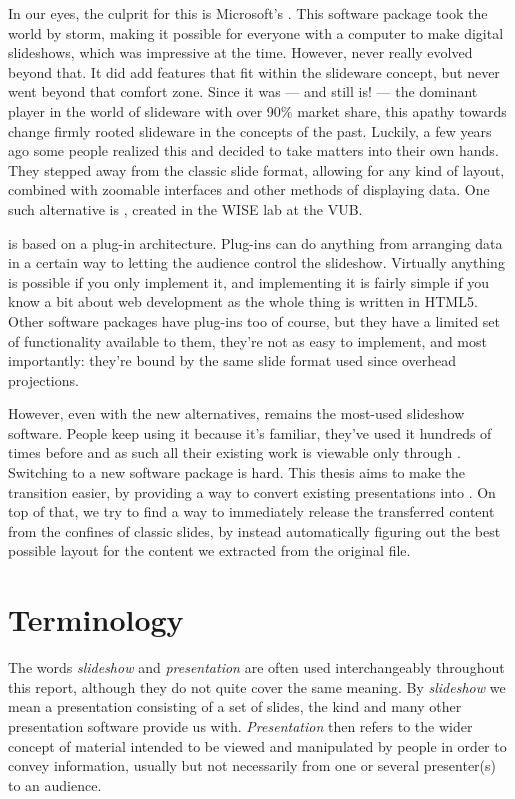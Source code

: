   In our eyes, the culprit for this is Microsoft's \ppt. This software package
  took the world by storm, making it possible for everyone with a computer to
  make digital slideshows, which was impressive at the time. However, \ppt*
  never really evolved beyond that. It did add features that fit within the
  slideware concept, but never went beyond that comfort zone. Since it was ---
  and still is! --- the dominant player in the world of slideware with over
  90\% market share, this apathy towards change firmly rooted slideware in the
  concepts of the past. Luckily, a few years ago some people realized this and
  decided to take matters into their own hands. They stepped away from the
  classic slide format, allowing for any kind of layout, combined with zoomable
  interfaces and other methods of displaying data. One such alternative is
  \mxp, created in the WISE lab at the VUB.

  \mxp is based on a plug-in architecture. Plug-ins can do anything from
  arranging data in a certain way to letting the audience control the
  slideshow. Virtually anything is possible if you only implement it, and
  implementing it is fairly simple if you know a bit about web development as
  the whole thing is written in HTML5. Other software packages have plug-ins
  too of course, but they have a limited set of functionality available to
  them, they're not as easy to implement, and most importantly: they're bound
  by the same slide format used since overhead projections.

  However, even with the new alternatives, \ppt* remains the most-used slideshow
  software. People keep using it because it's familiar, they've used it
  hundreds of times before and as such all their existing work is viewable only
  through \ppt. Switching to a new software package is hard. This thesis aims
  to make the transition easier, by providing a way to convert existing \ppt
  presentations into \mxp. On top of that, we try to find a way to immediately
  release the transferred content from the confines of classic slides, by
  instead automatically figuring out the best possible layout for the content
  we extracted from the original \ppt file.

  \section{Terminology}


   The words \emph{slideshow} and \emph{presentation} are often used
   interchangeably throughout this report, although they do not quite cover the
   same meaning. By \emph{slideshow} we mean a presentation consisting of a set
   of slides, the kind \ppt* and many other presentation software provide us
   with. \emph{Presentation} then refers to the wider concept of material
   intended to be viewed and manipulated by people in order to convey
   information, usually but not necessarily from one or several presenter(s) to
   an audience.

